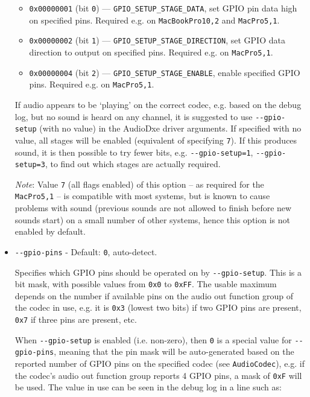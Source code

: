 \documentclass[]{article}
\providecommand{\tightlist}{%
  \setlength{\itemsep}{0pt}\setlength{\parskip}{0pt}}
\begin{document}
\begin{itemize}
  \begin{itemize}
  \tightlist
    \item \texttt{0x00000001} (bit \texttt{0}) --- \texttt{GPIO\_SETUP\_STAGE\_DATA},
    set GPIO pin data high on specified pins. Required e.g. on \texttt{MacBookPro10,2} and \texttt{MacPro5,1}.
    \item \texttt{0x00000002} (bit \texttt{1}) --- \texttt{GPIO\_SETUP\_STAGE\_DIRECTION},
    set GPIO data direction to output on specified pins. Required e.g. on \texttt{MacPro5,1}.
    \item \texttt{0x00000004} (bit \texttt{2}) --- \texttt{GPIO\_SETUP\_STAGE\_ENABLE},
    enable specified GPIO pins. Required e.g. on \texttt{MacPro5,1}.
  \end{itemize} \medskip

  If audio appears to be `playing' on the correct codec, e.g. based on the debug log, but no
  sound is heard on any channel, it is suggested to use \texttt{-{}-gpio-setup} (with no
  value) in the AudioDxe driver arguments. If specified with no value, all
  stages will be enabled (equivalent of specifying \texttt{7}). If this produces sound,
  it is then possible to try fewer bits, e.g. \texttt{-{}-gpio-setup=1}, \texttt{-{}-gpio-setup=3},
  to find out which stages are actually required. \medskip

  \emph{Note}: Value \texttt{7} (all flags enabled) of this option -- as required for the
  \texttt{MacPro5,1} -- is compatible with most systems, but is known to cause problems with
  sound (previous sounds are not allowed to finish before new sounds start) on a small number
  of other systems, hence this option is not enabled by default. \medskip

	\item \texttt{-{}-gpio-pins} - Default: \texttt{0}, auto-detect. \medskip

	Specifies which GPIO pins should be operated on by \texttt{-{}-gpio-setup}. This is a bit mask,
  with possible values from \texttt{0x0} to \texttt{0xFF}. The usable maximum depends on
  the number if available pins on the audio out function group of the codec in use, e.g. it is
  \texttt{0x3} (lowest two bits) if two GPIO pins are present, \texttt{0x7} if three pins are present,
  etc. \medskip

  When \texttt{-{}-gpio-setup} is enabled (i.e. non-zero), then \texttt{0} is a special
  value for \texttt{-{}-gpio-pins}, meaning that the pin mask will be auto-generated based on the
  reported number of GPIO pins on the specified codec (see \texttt{AudioCodec}), e.g. if the
  codec's audio out function group reports 4 GPIO pins, a mask of \texttt{0xF} will be used.
  The value in use can be seen in the debug log in a line such as: \medskip


\end{itemize}
\end{document}
